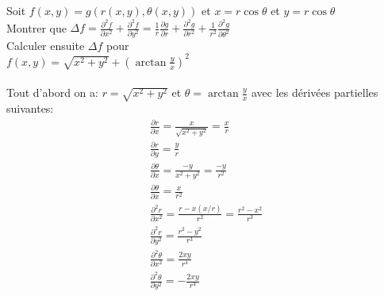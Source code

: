 \begin{myExample}
	Soit $f(x,y)=g(r(x,y),\theta(x,y))$ et $x=r\cos\theta$ et $y=r\cos\theta$\\
	Montrer que $\Delta f=\frac{\partial^2 f}{\partial x^2}+\frac{\partial^2 f}{\partial y^2}=\frac{1}{r}\frac{\partial g}{\partial r}+\frac{\partial^2 g}{\partial r^2}+\frac{1}{r^2}\frac{\partial^2 g}{\partial \theta^2}$
	\\
	Calculer ensuite $\Delta f$ pour
	\\
	$f(x,y)=\sqrt{x^2+y^2}+(\arctan{\frac{y}{x}})^2$
	\\\\
	Tout d'abord on a: $r=\sqrt{x^2+y^2}$ et $\theta=\arctan{\frac{y}{x}}$ avec les dérivées partielles suivantes:
	\begin{eqnarray*}
		\frac{\partial r}{\partial x}=\frac{x}{\sqrt{x^2+y^2}}=\frac{x}{r}
		\\
		\frac{\partial r}{\partial y}=\frac{y}{r}
		\\
		\frac{\partial \theta}{\partial x}=\frac{-y}{x^2+y^2}=\frac{-y}{r^2}
		\\
		\frac{\partial \theta}{\partial x}=\frac{x}{r^2}
		\\
		\frac{\partial^2 r}{\partial x^2}=\frac{r-x(x/r)}{r^2}=\frac{r^2-x^2}{r^3}
		\\
		\frac{\partial^2 r}{\partial y^2}=\frac{r^2-y^2}{r^3}
		\\
		\frac{\partial^2 \theta}{\partial x^2}=\frac{2xy}{r^4}
		\\
		\frac{\partial^2 \theta}{\partial y^2}=-\frac{2xy}{r^4}
	\end{eqnarray*}
	

\end{myExample}
